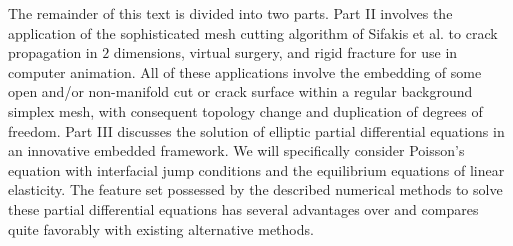 The remainder of this text is divided into two parts. Part II involves the application of the sophisticated mesh cutting algorithm of Sifakis et al. \cite{Sifakis07} to crack propagation in $2$ dimensions, virtual surgery, and rigid fracture for use in computer animation. All of these applications involve the embedding of some open and/or non-manifold cut or crack surface within a regular background simplex mesh, with consequent topology change and duplication of degrees of freedom. Part III discusses the solution of elliptic partial differential equations in an innovative embedded framework. We will specifically consider Poisson's equation with interfacial jump conditions and the equilibrium equations of linear elasticity. The feature set possessed by the described numerical methods to solve these partial differential equations has several advantages over and compares quite favorably with existing alternative methods.

\renewcommand{\thechapter}{\arabic{chapter}}
